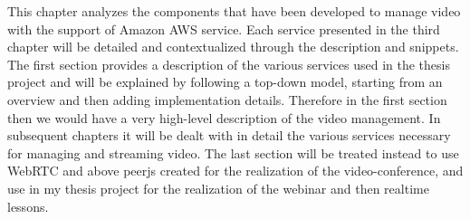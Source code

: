 This chapter analyzes the components that have been developed to manage video with the support of Amazon AWS service.
Each service presented in the third chapter will be detailed and contextualized through the description and snippets. 
The first section provides a description of the various services used in the thesis project and will be explained by following a top-down model, starting from an overview and then adding implementation details.
Therefore in the first section then we would have a very high-level description of the video management.
In subsequent chapters it will be dealt with in detail the various services necessary for managing and streaming video.
The last section will be treated instead to use WebRTC and above peerjs created for the realization of the video-conference, and use in my thesis project for the realization of the webinar and then realtime lessons.